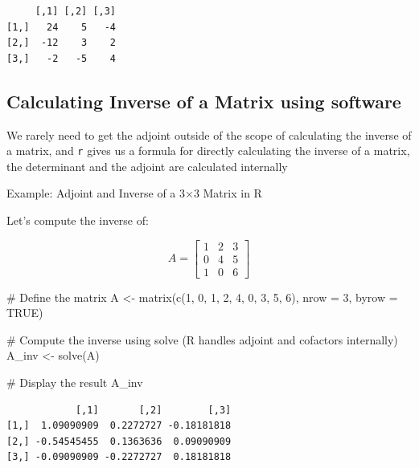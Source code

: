 \documentclass[
  letterpaper,
  DIV=11,
  numbers=noendperiod]{scrartcl}
\newenvironment{Shaded}{\begin{snugshade}}{\end{snugshade}}
\newcommand{\AttributeTok}[1]{\textcolor[rgb]{0.40,0.45,0.13}{#1}}
\newcommand{\CommentTok}[1]{\textcolor[rgb]{0.37,0.37,0.37}{#1}}
\newcommand{\ConstantTok}[1]{\textcolor[rgb]{0.56,0.35,0.01}{#1}}
\newcommand{\DecValTok}[1]{\textcolor[rgb]{0.68,0.00,0.00}{#1}}
\newcommand{\FunctionTok}[1]{\textcolor[rgb]{0.28,0.35,0.67}{#1}}
\newcommand{\NormalTok}[1]{\textcolor[rgb]{0.00,0.23,0.31}{#1}}
\newcommand{\OtherTok}[1]{\textcolor[rgb]{0.00,0.23,0.31}{#1}}
\begin{document}
\begin{verbatim}
     [,1] [,2] [,3]
[1,]   24    5   -4
[2,]  -12    3    2
[3,]   -2   -5    4
\end{verbatim}

\subsection{Calculating Inverse of a Matrix using
software}\label{calculating-inverse-of-a-matrix-using-software}

We rarely need to get the adjoint outside of the scope of calculating
the inverse of a matrix, and \texttt{r} gives us a formula for directly
calculating the inverse of a matrix, the determinant and the adjoint are
calculated internally

Example: Adjoint and Inverse of a 3×3 Matrix in R

Let's compute the inverse of:

\[
A = \begin{bmatrix}
1 & 2 & 3 \\
0 & 4 & 5 \\
1 & 0 & 6
\end{bmatrix}
\]

\begin{Shaded}
\begin{Highlighting}[]
\CommentTok{\# Define the matrix}
\NormalTok{A }\OtherTok{\textless{}{-}} \FunctionTok{matrix}\NormalTok{(}\FunctionTok{c}\NormalTok{(}\DecValTok{1}\NormalTok{, }\DecValTok{0}\NormalTok{, }\DecValTok{1}\NormalTok{, }\DecValTok{2}\NormalTok{, }\DecValTok{4}\NormalTok{, }\DecValTok{0}\NormalTok{, }\DecValTok{3}\NormalTok{, }\DecValTok{5}\NormalTok{, }\DecValTok{6}\NormalTok{), }\AttributeTok{nrow =} \DecValTok{3}\NormalTok{, }\AttributeTok{byrow =} \ConstantTok{TRUE}\NormalTok{)}

\CommentTok{\# Compute the inverse using solve (R handles adjoint and cofactors internally)}
\NormalTok{A\_inv }\OtherTok{\textless{}{-}} \FunctionTok{solve}\NormalTok{(A)}

\CommentTok{\# Display the result}
\NormalTok{A\_inv}
\end{Highlighting}
\end{Shaded}

\begin{verbatim}
            [,1]       [,2]        [,3]
[1,]  1.09090909  0.2272727 -0.18181818
[2,] -0.54545455  0.1363636  0.09090909
[3,] -0.09090909 -0.2272727  0.18181818
\end{verbatim}
\end{document}
